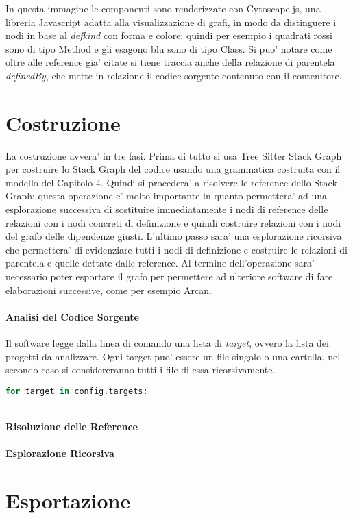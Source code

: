 In questa immagine le componenti sono renderizzate con Cytoscape.js, una libreria Javascript adatta alla visualizzazione di grafi, in modo da distinguere i nodi in base al \emph{defkind} con forma e colore: quindi per esempio i quadrati rossi sono di tipo Method e gli esagono blu sono di tipo Class.
Si puo' notare come oltre alle reference gia' citate si tiene traccia anche della relazione di parentela \emph{definedBy}, che mette in relazione il codice sorgente contenuto con il contenitore.

\section{Costruzione}

La costruzione avvera' in tre fasi.
Prima di tutto si usa Tree Sitter Stack Graph per costruire lo Stack Graph del codice usando una grammatica costruita con il modello del Capitolo 4.
Quindi si procedera' a risolvere le reference dello Stack Graph: questa operazione e' molto importante in quanto permettera' ad una esplorazione successiva di sostituire immediatamente i nodi di reference delle relazioni con i nodi concreti di definizione e quindi costruire relazioni con i nodi del grafo delle dipendenze giusti.
L'ultimo passo sara' una esplorazione ricorsiva che permettera' di evidenziare tutti i nodi di definizione e costruire le relazioni di parentela e quelle dettate dalle reference.
Al termine dell'operazione sara' necessario poter esportare il grafo per permettere ad ulteriore software di fare elaborazioni successive, come per esempio Arcan.

\paragraph{Analisi del Codice Sorgente}

Il software legge dalla linea di comando una lista di \emph{target}, ovvero la lista dei progetti da analizzare.
Ogni target puo' essere un file singolo o una cartella, nel secondo caso si considereranno tutti i file di essa ricorsivamente.


\begin{lstlisting}[language=Python, caption=pseudocodice]
for target in config.targets:
    

\end{lstlisting}

\paragraph{Risoluzione delle Reference}


\paragraph{Esplorazione Ricorsiva}


\section{Esportazione}

